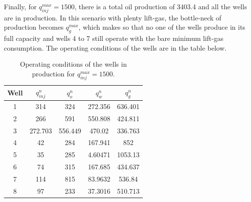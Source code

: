 \documentclass[a4paper]{report}
\begin{document}
Finally, for $q_{inj}^{max} = 1500$, there is a total oil production of 3403.4 and all the wells are in production. In this scenario with plenty lift-gas, the bottle-neck of production becomes $q_g^{max}$, which makes so that no one of the wells produce in its full capacity and wells 4 to 7 still operate with the bare minimum lift-gas consumption. The operating conditions of the wells are in the table below.

\begin{table}[H]
    \centering
    \begin{tabular}{c|c|c|c|c}
	Well & $q_{inj}^{n}$ & $q_o^{n}$ & $q_w^{n}$ & $q_g^{n}$ \\
	\hline
	1 & 314 & 324 & 272.356 & 636.401 \\
	2 & 266 & 591 & 550.808 & 424.811 \\
	3 & 272.703 & 556.449 & 470.02 & 336.763 \\
	4 & 42 & 284 & 167.941 & 852 \\
	5 & 35 & 285 & 4.60471 & 1053.13 \\
	6 & 74 & 315 & 167.685 & 434.637 \\
	7 & 114 & 815 & 83.9632 & 536.84 \\
	8 & 97 & 233 & 37.3016 & 510.713 \\
    \end{tabular}
    \caption*{Operating conditions of the wells in production for $q_{inj}^{max} = 1500$.}
    \label{tab:label}
\end{table}
\end{document}

